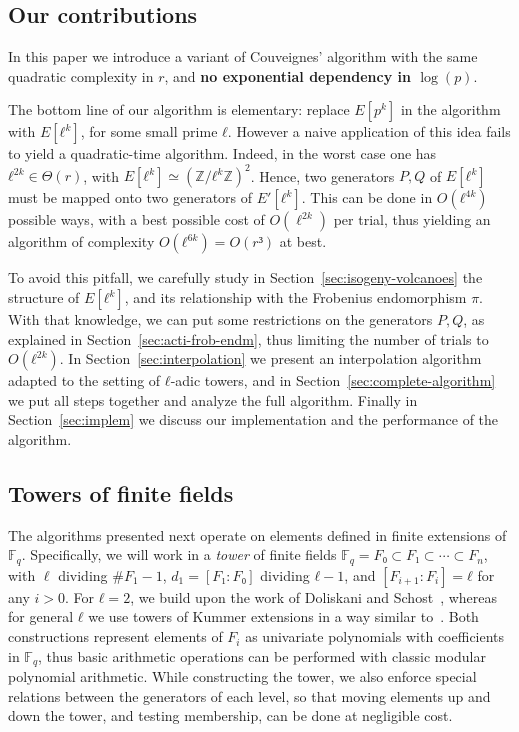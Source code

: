 \documentclass{lms}
\newcommand{\F}{\mathbb{F}}
\begin{document}
\subsection{Our contributions}

In this paper we
introduce a variant of Couveignes' algorithm with the same quadratic
complexity in $r$, and \textbf{no exponential dependency in $\log(p)$}.

The bottom line of our algorithm is elementary: replace $E[p^k]$ in
the algorithm with $E[ℓ^k]$, for some small prime $ℓ$. However a
naive application of this idea fails to yield a quadratic-time
algorithm. Indeed, in the worst case one has $ℓ^{2k}∈\Theta(r)$, with
$E[ℓ^k]≃(ℤ/ℓ^kℤ)^2$. Hence, two generators $P,Q$ of $E[ℓ^k]$ must
be mapped onto two generators of $E'[ℓ^k]$. This can be done in
$O(ℓ^{4k})$ possible ways, with a best possible cost of $O(\ell^{2k})$
per trial,
thus yielding an
algorithm of complexity $O(ℓ^{6k})=O(r³)$ at best.

To avoid this pitfall, we carefully study
in Section~\ref{sec:isogeny-volcanoes} the structure of
$E[ℓ^k]$, and its relationship with the Frobenius endomorphism $π$.
With that knowledge, we can put some restrictions on the generators $P,Q$,
as explained in Section~\ref{sec:acti-frob-endm},
thus limiting the number of trials to $O(ℓ^{2k})$.
In Section~\ref{sec:interpolation}
we present an interpolation algorithm adapted to the setting of
$ℓ$-adic towers, and in Section~\ref{sec:complete-algorithm} we put
all steps together and analyze the full algorithm. Finally in
Section~\ref{sec:implem} we discuss our implementation and the
performance of the algorithm.



\subsection{Towers of finite fields}
\label{sub:towers}

The algorithms presented next operate on elements defined in finite
extensions of $\F_q$. Specifically, we will work in a \emph{tower} of finite
fields $\F_q=F₀⊂F₁⊂\cdots⊂F_n$, with $\ell$ dividing $\#F_1-1$, $d_1=[F₁:F₀]$
dividing $ℓ-1$, and $[F_{i+1}:F_i]=ℓ$ for any $i>0$. For $ℓ=2$,
we build upon the work of Doliskani and Schost~\cite{DoSc12}, whereas for
general $ℓ$ we use towers of Kummer extensions in a way similar
to~\cite[\S2]{DeDoSc13}.  Both constructions represent elements of
$F_i$ as univariate polynomials with coefficients in $\F_q$, thus
basic arithmetic operations can be performed with classic modular
polynomial arithmetic. While constructing the tower, we also enforce
special relations between the generators of each level, so that moving
elements up and down the tower, and testing membership, can be done at
negligible cost.
\end{document}
